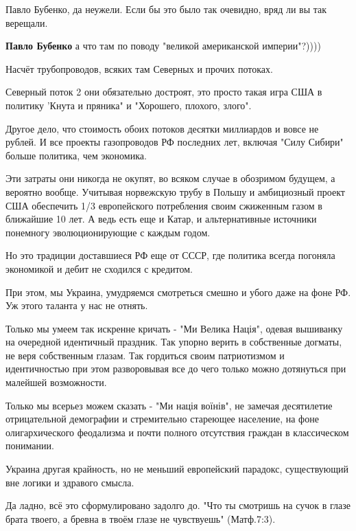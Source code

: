 \begin{itemize}
\begin{itemize}
Павло Бубенко, да неужели. Если бы это было так очевидно, вряд ли вы так верещали.

\textbf{Павло Бубенко} а что там по поводу "великой американской империи"?))))
\end{itemize} %


Насчёт трубопроводов, всяких там Северных и прочих потоках.

Северный поток 2 они обязательно достроят, это просто такая игра США в политику
'Кнута и пряника" и "Хорошего, плохого, злого".

Другое дело, что стоимость обоих потоков десятки миллиардов и вовсе не рублей.
И все проекты газопроводов РФ последних лет, включая "Силу Сибири" больше
политика, чем экономика.

Эти затраты они никогда не окупят, во всяком случае в обозримом будущем, а
вероятно вообще. Учитывая норвежскую трубу в Польшу и амбициозный проект США
обеспечить 1/3 европейского потребления своим сжиженным газом в ближайшие 10
лет. А ведь есть еще и Катар, и альтернативные источники понемногу
эволюционирующие с каждым годом.

Но это традиции доставшиеся РФ еще от СССР, где политика всегда погоняла
экономикой и дебит не сходился с кредитом.

При этом, мы Украина, умудряемся смотреться смешно и убого даже на фоне РФ. Уж
этого таланта у нас не отнять.

Только мы умеем так искренне кричать - "Ми Велика Нація", одевая вышиванку на
очередной идентичный праздник. Так упорно верить в собственные догматы, не веря
собственным глазам. Так гордиться своим патриотизмом и идентичностью при этом
разворовывая все до чего только можно дотянуться при малейшей возможности.

Только мы всерьез можем сказать - "Ми нація воїнів", не замечая десятилетие
отрицательной демографии и стремительно стареющее население, на фоне
олигархического феодализма и почти полного отсутствия граждан в классическом
понимании.

Украина другая крайность, но не меньший европейский парадокс, существующий вне
логики и здравого смысла.

\begin{itemize} %
Да ладно, всё это сформулировано задолго до. "Что ты смотришь на сучок в глазе брата твоего, а бревна в твоём глазе не чувствуешь" (Матф.7:3).


\end{itemize}
\end{itemize}
